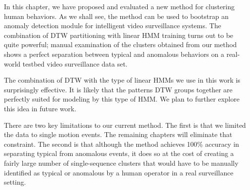 In this chapter, we have proposed and evaluated a new method for
clustering human behaviors.  As we shall see, the method can be used
to bootstrap an anomaly detection module for intelligent video
surveillance systems.  The combination of DTW partitioning with linear
HMM training turns out to be quite powerful; manual examination of the
clusters obtained from our method shows a perfect separation between
typical and anomalous behaviors on a real-world testbed video
surveillance data set.

The combination of DTW with the type of linear HMMs we use in this
work is surprisingly effective. It is likely that the patterns DTW
groups together are perfectly suited for modeling by this type of HMM.
We plan to further explore this idea in future work.

There are two key limitations to our current method. The first is that
we limited the data to single motion events. The remaining chapters
will eliminate that constraint. The second is that although the method
achieves 100\% accuracy in separating typical from anomalous events,
it does so at the cost of creating a fairly large number of
single-sequence clusters that would have to be manually identified as
typical or anomalous by a human operator in a real surveillance
setting.

\FloatBarrier

